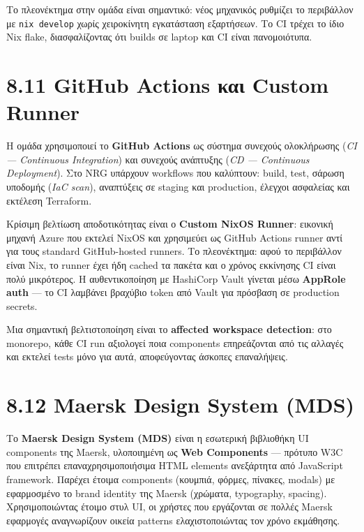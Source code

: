 Το πλεονέκτημα στην ομάδα είναι σημαντικό: νέος μηχανικός ρυθμίζει το
περιβάλλον με \texttt{nix\ develop} χωρίς χειροκίνητη εγκατάσταση
εξαρτήσεων. Το CI τρέχει το ίδιο Nix flake, διασφαλίζοντας ότι builds σε
laptop και CI είναι πανομοιότυπα.

\section{8.11 GitHub Actions και Custom
Runner}\label{github-actions-ux3baux3b1ux3b9-custom-runner}

Η ομάδα χρησιμοποιεί το \textbf{GitHub Actions} ως σύστημα συνεχούς
ολοκλήρωσης (\emph{CI --- Continuous Integration}) και συνεχούς
ανάπτυξης (\emph{CD --- Continuous Deployment}). Στο NRG υπάρχουν
workflows που καλύπτουν: build, test, σάρωση υποδομής (\emph{IaC scan}),
αναπτύξεις σε staging και production, έλεγχοι ασφαλείας και εκτέλεση
Terraform.

Κρίσιμη βελτίωση αποδοτικότητας είναι ο \textbf{Custom NixOS Runner}:
εικονική μηχανή Azure που εκτελεί NixOS και χρησιμεύει ως GitHub Actions
runner αντί για τους standard GitHub-hosted runners. Το πλεονέκτημα:
αφού το περιβάλλον είναι Nix, το runner έχει ήδη cached τα πακέτα και ο
χρόνος εκκίνησης CI είναι πολύ μικρότερος. Η αυθεντικοποίηση με
HashiCorp Vault γίνεται μέσω \textbf{AppRole auth} --- το CI λαμβάνει
βραχύβιο token από Vault για πρόσβαση σε production secrets.

Μια σημαντική βελτιστοποίηση είναι το \textbf{affected workspace
detection}: στο monorepo, κάθε CI run αξιολογεί ποια components
επηρεάζονται από τις αλλαγές και εκτελεί tests μόνο για αυτά,
αποφεύγοντας άσκοπες επαναλήψεις.

\section{8.12 Maersk Design System
(MDS)}\label{maersk-design-system-mds}

Το \textbf{Maersk Design System (MDS)} είναι η εσωτερική βιβλιοθήκη UI
components της Maersk, υλοποιημένη ως \textbf{Web Components} ---
πρότυπο W3C που επιτρέπει επαναχρησιμοποιήσιμα HTML elements ανεξάρτητα
από JavaScript framework. Παρέχει έτοιμα components (κουμπιά, φόρμες,
πίνακες, modals) με εφαρμοσμένο το brand identity της Maersk (χρώματα,
typography, spacing). Χρησιμοποιώντας έτοιμο στυλ UI, οι χρήστες που
εργάζονται σε πολλές Maersk εφαρμογές αναγνωρίζουν οικεία patterns
ελαχιστοποιώντας τον χρόνο εκμάθησης.

